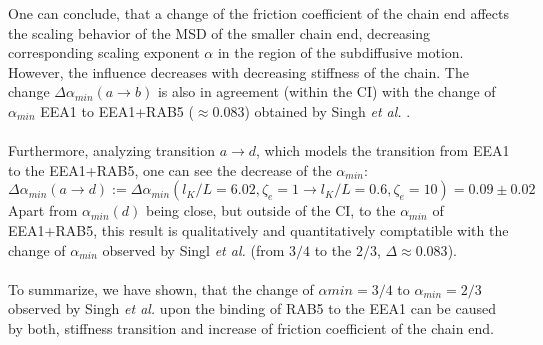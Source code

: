 \documentclass[
    paper=A4,pagesize=automedia,fontsize=12pt,
    BCOR=15mm,DIV=22,
    twoside,headinclude,footinclude=false,
    fleqn,             %
    bibliography=totocnumbered,          %
    listof=totoc,                %
    listof=flat,                 %
    cleardoublepage=empty      %
    numbers=endperiod
]{scrartcl}
\begin{document}
One can conclude, that a
change of the friction coefficient of the chain end affects the scaling behavior
of the MSD of the smaller chain end, decreasing corresponding scaling exponent $\alpha$ 
in the region of the subdiffusive motion. However, the influence decreases with 
decreasing stiffness of the chain. The change $\Delta \alpha_{min}(a \rightarrow b)$ is also
in agreement (within the CI) with the change of $\alpha_{min}$ EEA1 to EEA1+RAB5 ($\approx 0.083$)
obtained by Singh \emph{et al.} \cite{Singh:2022}.
\\
\\
Furthermore, analyzing transition $a \rightarrow d$, which models the transition from 
EEA1 to the EEA1+RAB5, one can see the decrease of the $\alpha_{min}$:
\begin{equation} \label{eq:alpha_min_l_p_zeta_e_trans}
    \Delta \alpha_{min}(a \rightarrow d) := \Delta \alpha_{min}(l_K/L=6.02,\zeta_e=1 \rightarrow l_K/L=0.6,\zeta_e=10) = 0.09 \pm 0.02
\end{equation}
Apart from $\alpha_{min}(d)$ being close, but outside of the CI, to the $\alpha_{min}$
of EEA1+RAB5, this result is qualitatively and quantitatively comptatible with the change
of $\alpha_{min}$ observed by Singl \emph{et al.} \cite{Singh:2022} 
(from $3/4$ to the $2/3$, $\Delta\approx0.083$).
\\
\\
To summarize, we have shown, that the change of $\alpha{min}=3/4$ to $\alpha_{min}=2/3$
observed by Singh \emph{et al.} \cite{Singh:2022} upon the binding of RAB5 to the EEA1
can be caused by both, 
stiffness transition and increase of friction coefficient of the chain end. 
\end{document}
